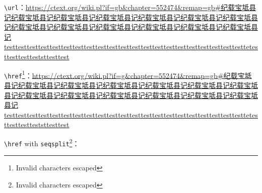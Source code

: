 
\ifLuaTeX
\LuaLaTeX 
\fi
\ifXeTeX
\XeLaTeX 
\fi



\verb|\url|：\url{https://ctext.org/wiki.pl?if=gb&chapter=552474&remap=gb#纪载宝坻县记纪载宝坻县记纪载宝坻县记纪载宝坻县记纪载宝坻县记纪载宝坻县记纪载宝坻县记纪载宝坻县记纪载宝坻县记纪载宝坻县记纪载宝坻县记纪载宝坻县记纪载宝坻县记testtesttesttesttesttesttesttesttesttesttesttesttesttesttesttesttesttesttesttesttesttetesttesttestteststtesttest}

\verb|\href|\footnote{Invalid characters escaped}：\href{https://ctext.org/wiki.pl?if=gb&chapter=552474&remap=gb#纪载宝坻县记纪载宝坻县记纪载宝坻县记纪载宝坻县记纪载宝坻县记纪载宝坻县记纪载宝坻县记纪载宝坻县记纪载宝坻县记纪载宝坻县记纪载宝坻县记纪载宝坻县记纪载宝坻县记testtesttesttesttesttesttesttesttesttesttesttesttesttesttesttesttesttesttesttesttesttetesttesttestteststtesttest}{https://ctext.org/wiki.pl?if=g\&chapter=552474\&remap=gb\#纪载宝坻县记纪载宝坻县记纪载宝坻县记纪载宝坻县记纪载宝坻县记纪载宝坻县记纪载宝坻县记纪载宝坻县记纪载宝坻县记纪载宝坻县记纪载宝坻县记纪载宝坻县记纪载宝坻县记testtesttesttesttesttesttesttesttesttesttesttesttesttesttesttesttesttesttesttesttesttetesttesttestteststtesttest}

\verb|\href| with \verb|seqsplit|\footnote{Invalid characters escaped}：\href{https://ctext.org/wiki.pl?if=gb&chapter=552474&remap=gb#纪载宝坻县记纪载宝坻县记纪载宝坻县记纪载宝坻县记纪载宝坻县记纪载宝坻县记纪载宝坻县记纪载宝坻县记纪载宝坻县记纪载宝坻县记纪载宝坻县记纪载宝坻县记纪载宝坻县记testtesttesttesttesttesttesttesttesttesttesttesttesttesttesttesttesttesttesttesttesttetesttesttestteststtesttest}{}
